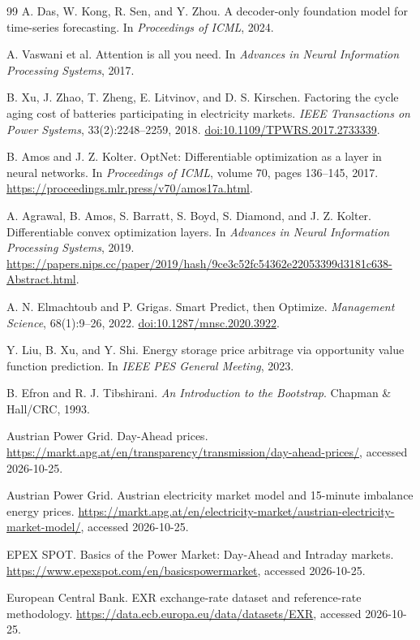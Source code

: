 \documentclass[UTF8,a4paper,11pt,fontset=fandol]{ctexart}
\begin{document}
\begin{thebibliography}{99}
A. Das, W. Kong, R. Sen, and Y. Zhou.
\newblock A decoder-only foundation model for time-series forecasting.
\newblock In \emph{Proceedings of ICML}, 2024.

A. Vaswani et al.
\newblock Attention is all you need.
\newblock In \emph{Advances in Neural Information Processing Systems}, 2017.

B. Xu, J. Zhao, T. Zheng, E. Litvinov, and D. S. Kirschen.
\newblock Factoring the cycle aging cost of batteries participating in electricity markets.
\newblock \emph{IEEE Transactions on Power Systems}, 33(2):2248--2259, 2018.
\newblock \href{https://doi.org/10.1109/TPWRS.2017.2733339}{doi:10.1109/TPWRS.2017.2733339}.

B. Amos and J. Z. Kolter.
\newblock OptNet: Differentiable optimization as a layer in neural networks.
\newblock In \emph{Proceedings of ICML}, volume 70, pages 136--145, 2017.
\newblock \url{https://proceedings.mlr.press/v70/amos17a.html}.

A. Agrawal, B. Amos, S. Barratt, S. Boyd, S. Diamond, and J. Z. Kolter.
\newblock Differentiable convex optimization layers.
\newblock In \emph{Advances in Neural Information Processing Systems}, 2019.
\newblock \url{https://papers.nips.cc/paper/2019/hash/9ce3c52fc54362e22053399d3181c638-Abstract.html}.

A. N. Elmachtoub and P. Grigas.
\newblock Smart Predict, then Optimize.
\newblock \emph{Management Science}, 68(1):9--26, 2022.
\newblock \href{https://doi.org/10.1287/mnsc.2020.3922}{doi:10.1287/mnsc.2020.3922}.

Y. Liu, B. Xu, and Y. Shi.
\newblock Energy storage price arbitrage via opportunity value function prediction.
\newblock In \emph{IEEE PES General Meeting}, 2023.

B. Efron and R. J. Tibshirani.
\newblock \emph{An Introduction to the Bootstrap}.
\newblock Chapman \& Hall/CRC, 1993.

Austrian Power Grid.
\newblock Day-Ahead prices.
\newblock \url{https://markt.apg.at/en/transparency/transmission/day-ahead-prices/}, accessed 2026-10-25.

Austrian Power Grid.
\newblock Austrian electricity market model and 15-minute imbalance energy prices.
\newblock \url{https://markt.apg.at/en/electricity-market/austrian-electricity-market-model/}, accessed 2026-10-25.

EPEX SPOT.
\newblock Basics of the Power Market: Day-Ahead and Intraday markets.
\newblock \url{https://www.epexspot.com/en/basicspowermarket}, accessed 2026-10-25.

European Central Bank.
\newblock EXR exchange-rate dataset and reference-rate methodology.
\newblock \url{https://data.ecb.europa.eu/data/datasets/EXR}, accessed 2026-10-25.

\end{thebibliography}
\end{document}
